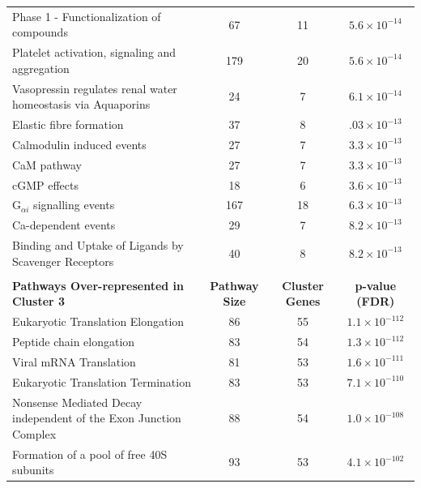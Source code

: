 \begin{table}[!hp]
{\begin{tabular}{lccc}
  Phase 1 - Functionalization of compounds &  67 &  11 & $5.6 \times 10^{-14}$ \\ 
  \rowcolor{Cluster_Green!15} 
  Platelet activation, signaling and aggregation & 179 &  20 & $5.6 \times 10^{-14}$ \\ 
  \rowcolor{Cluster_Green!20} 
  Vasopressin regulates renal water homeostasis via Aquaporins &  24 &   7 & $6.1 \times 10^{-14}$ \\ 
  \rowcolor{Cluster_Green!15} 
  Elastic fibre formation &  37 &   8 & $.03 \times 10^{-13}$ \\ 
  \rowcolor{Cluster_Green!20} 
  Calmodulin induced events &  27 &   7 & $3.3 \times 10^{-13}$ \\ 
  \rowcolor{Cluster_Green!15} 
  CaM pathway &  27 &   7 & $3.3 \times 10^{-13}$ \\ 
  \rowcolor{Cluster_Green!20} 
  cGMP effects &  18 &   6 & $3.6 \times 10^{-13}$ \\ 
  \rowcolor{Cluster_Green!15} 
  G$_{\alpha i}$ signalling events & 167 &  18 & $6.3 \times 10^{-13}$ \\ 
  \rowcolor{Cluster_Green!20} 
  Ca-dependent events &  29 &   7 & $8.2 \times 10^{-13}$ \\ 
  \rowcolor{Cluster_Green!15} 
  Binding and Uptake of Ligands by Scavenger Receptors &  40 &   8 & $8.2 \times 10^{-13}$ \\ 
  \hline
  \\
  \cellcolor{white} \large{\textbf{Pathways Over-represented in Cluster 3}} & \large{\textbf{Pathway Size}} & \large{\textbf{Cluster Genes}} & \large{\textbf{p-value (FDR)}} \\ %
  \hline
  \rowcolor{Cluster_Orange!30}
  Eukaryotic Translation Elongation &  86 &  55 & $1.1 \times 10^{-112}$ \\ 
  \rowcolor{Cluster_Orange!20} 
  Peptide chain elongation &  83 &  54 & $1.3 \times 10^{-112}$ \\ 
  \rowcolor{Cluster_Orange!30} 
  Viral mRNA Translation &  81 &  53 & $1.6 \times 10^{-111}$ \\ 
  \rowcolor{Cluster_Orange!20} 
  Eukaryotic Translation Termination &  83 &  53 & $7.1 \times 10^{-110}$ \\ 
  \rowcolor{Cluster_Orange!30} 
  Nonsense Mediated Decay independent of the Exon Junction Complex &  88 &  54 & $1.0 \times 10^{-108}$ \\ 
  \rowcolor{Cluster_Orange!20} 
  Formation of a pool of free 40S subunits &  93 &  53 & $4.1 \times 10^{-102}$ \\ 

\end{tabular}}
\end{table}
